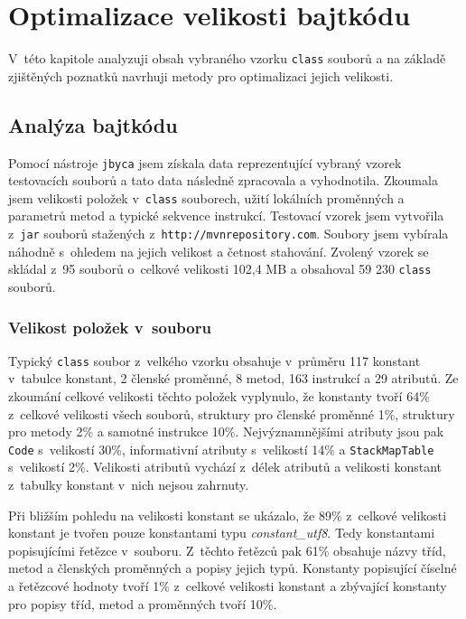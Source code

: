 \chapter{Optimalizace velikosti bajtkódu}\label{Optimization}

V~této kapitole analyzuji obsah vybraného vzorku \texttt{class} souborů a na základě zjištěných poznatků navrhuji metody pro optimalizaci jejich velikosti. 

\section{Analýza bajtkódu}\label{Optimization:Analysis}

Pomocí nástroje \texttt{jbyca} jsem získala data reprezentující vybraný vzorek testovacích souborů a tato data následně zpracovala a vyhodnotila. Zkoumala jsem velikosti položek v~\texttt{class} souborech, užití lokálních proměnných a parametrů metod a typické sekvence instrukcí. Testovací vzorek jsem vytvořila z~\texttt{jar} souborů stažených z~\texttt{http://mvnrepository.com}. Soubory jsem vybírala náhodně s~ohledem na jejich velikost a četnost stahování. Zvolený vzorek se skládal z~95 souborů o~celkové velikosti 102,4 MB a obsahoval 59 230 \texttt{class} souborů.

\subsection{Velikost položek v~souboru}

Typický \texttt{class} soubor z~velkého vzorku obsahuje v~průměru 117 konstant v~tabulce konstant, 2 členské proměnné, 8 metod, 163 instrukcí a 29 atributů. Ze zkoumání celkové velikosti těchto položek vyplynulo, že konstanty tvoří 64\% z~celkové velikosti všech souborů, struktury pro členské proměnné 1\%, struktury pro metody 2\% a samotné instrukce 10\%.
Nejvýznamnějšími atributy jsou pak \texttt{Code} s~velikostí 30\%, informativní atributy s~velikostí 14\% a \texttt{StackMapTable} s~velikostí 2\%. Velikosti atributů vychází z~délek atributů a velikosti konstant z~tabulky konstant v~nich nejsou zahrnuty.

Při bližším pohledu na velikosti konstant se ukázalo, že 89\% z~celkové velikosti konstant je tvořen pouze konstantami typu \textit{constant\_utf8}. Tedy konstantami popisujícími řetězce v~souboru. Z~těchto řetězců pak 61\% obsahuje názvy tříd, metod a členských proměnných a popisy jejich typů. Konstanty popisující číselné a řetězcové hodnoty tvoří 1\% z~celkové velikosti konstant a zbývající konstanty pro popisy tříd, metod a proměnných tvoří 10\%.

